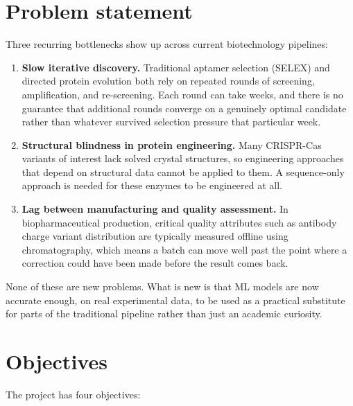 \documentclass[11pt,a4paper]{article}
\begin{document}
\section{Problem statement}

Three recurring bottlenecks show up across current biotechnology pipelines:

\begin{enumerate}
\item \textbf{Slow iterative discovery.} Traditional aptamer selection (SELEX) and directed protein evolution both rely on repeated rounds of screening, amplification, and re-screening. Each round can take weeks, and there is no guarantee that additional rounds converge on a genuinely optimal candidate rather than whatever survived selection pressure that particular week.
\item \textbf{Structural blindness in protein engineering.} Many CRISPR-Cas variants of interest lack solved crystal structures, so engineering approaches that depend on structural data cannot be applied to them. A sequence-only approach is needed for these enzymes to be engineered at all.
\item \textbf{Lag between manufacturing and quality assessment.} In biopharmaceutical production, critical quality attributes such as antibody charge variant distribution are typically measured offline using chromatography, which means a batch can move well past the point where a correction could have been made before the result comes back.
\end{enumerate}

None of these are new problems. What is new is that ML models are now accurate enough, on real experimental data, to be used as a practical substitute for parts of the traditional pipeline rather than just an academic curiosity.

\section{Objectives}

The project has four objectives:
\end{document}
